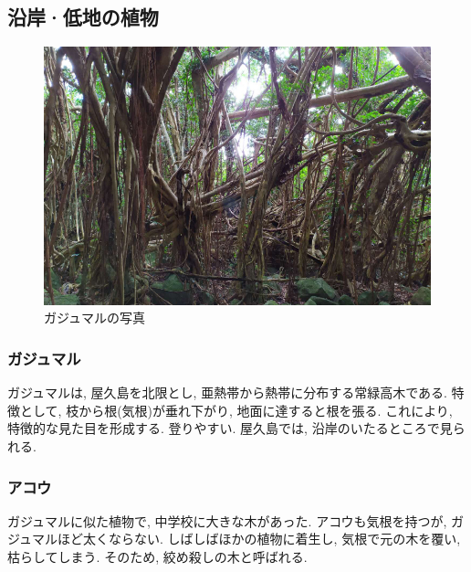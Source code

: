\documentclass[10pt,titlepage,a5paper]{ltjsbook}
\begin{document}
  \subsection{沿岸·低地の植物}
    \begin{minipage}{0.38\columnwidth}
      \begin{figure}[H]
            \centering
            \includegraphics[width=\columnwidth]{gajumaru.jpg}
            \caption{ガジュマルの写真}
            \label{fig:gajumaru_photo}
        \end{figure}
    \end{minipage}
    \hfill
    \begin{minipage}{0.58\columnwidth}
      \subsubsection*{ガジュマル}
      ガジュマルは, 屋久島を北限とし, 亜熱帯から熱帯に分布する常緑高木である. 特徴として, 枝から根(気根)が垂れ下がり, 地面に達すると根を張る. これにより, 特徴的な見た目を形成する. 登りやすい. 屋久島では, 沿岸のいたるところで見られる.
    \end{minipage}
    \vfill
    \begin{minipage}{0.58\columnwidth}
      \subsubsection*{アコウ}
        ガジュマルに似た植物で, 中学校に大きな木があった. アコウも気根を持つが, ガジュマルほど太くならない. しばしばほかの植物に着生し, 気根で元の木を覆い, 枯らしてしまう. そのため, 絞め殺しの木\footnotemark[8]と呼ばれる.
    \end{minipage}
\end{document}
